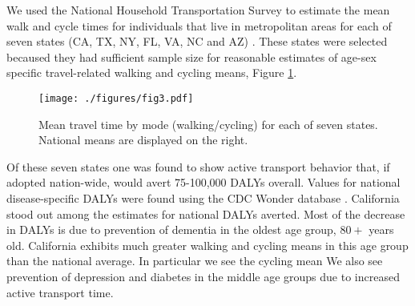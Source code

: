 We used the National Household Transportation Survey to estimate the
mean walk and cycle times for individuals that live in metropolitan
areas for each of seven states (CA, TX, NY, FL, VA, NC and AZ)
\cite{NHTS}.  These states were selected becaused they had sufficient
sample size for reasonable estimates of age-sex specific
travel-related walking and cycling means, Figure \ref{meanMatrices}.

\begin{figure}[t]
  \centerline{\texttt{[image: ./figures/fig3.pdf]}}
    \caption{Mean travel time by mode (walking/cycling) for each of
      seven states.  National means are displayed on the
      right.}\label{meanMatrices}
\end{figure}

Of these seven states one was found to show active transport behavior
that, if adopted nation-wide, would avert 75-100,000 DALYs overall.
Values for national disease-specific DALYs were found using the CDC
Wonder database \cite{CDCWonder}.  California stood out among the
estimates for national DALYs averted.  Most of the decrease in DALYs
is due to prevention of dementia in the oldest age group, $80+$ years
old.  California exhibits much greater walking and cycling means in
this age group than the national average. In particular we see the
cycling mean We also see prevention of depression and diabetes in the
middle age groups due to increased active transport time.
